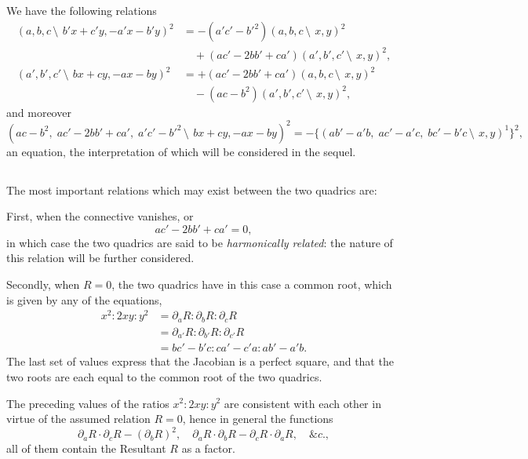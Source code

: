 \documentclass[11pt,a4paper]{book}
\begin{document}
\begin{center}
\subsection{}

We have the following relations
\begin{align*}
(a, b, c\,\setminus\!\!\:\, b'x + c'y, -a'x - b'y)^2 &= -(a'c' - b'^2)(a, b, c\,\setminus\!\!\:\, x, y)^2\\
&\quad + (ac' - 2bb' + ca')(a', b', c'\,\setminus\!\!\:\, x, y)^2,\\
(a', b', c'\,\setminus\!\!\:\, bx + cy, -ax - by)^2 &= +(ac' - 2bb' + ca')(a, b, c\,\setminus\!\!\:\, x, y)^2\\
&\quad - (ac - b^2)(a', b', c'\,\setminus\!\!\:\, x, y)^2,
\end{align*}
and moreover
\[
(ac - b^2,\; ac' - 2bb' + ca',\; a'c' - b'^2\,\setminus\!\!\:\, bx + cy, -ax - by)^2 = -\{(ab' - a'b,\; ac' - a'c,\; bc' - b'c\,\setminus\!\!\:\, x, y)^1\}^2,
\]
an equation, the interpretation of which will be considered in the sequel.

\subsection{}

The most important relations which may exist between the two quadrics are:

First, when the connective vanishes, or
\[
ac' - 2bb' + ca' = 0,
\]
in which case the two quadrics are said to be \textit{harmonically related}: the nature of this relation will be further considered.

Secondly, when $R = 0$, the two quadrics have in this case a common root, which is given by any of the equations,
\begin{align*}
x^2 : 2xy : y^2 &= \partial_a R : \partial_b R : \partial_c R \\
&= \partial_{a'}R : \partial_{b'}R : \partial_{c'}R \\
&= bc' - b'c : ca' - c'a : ab' - a'b.
\end{align*}
The last set of values express that the Jacobian is a perfect square, and that the two roots are each equal to the common root of the two quadrics.

The preceding values of the ratios $x^2 : 2xy : y^2$ are consistent with each other in virtue of the assumed relation $R = 0$, hence in general the functions
\[
\partial_a R \cdot \partial_c R - (\partial_b R)^2, \quad \partial_a R \cdot \partial_b R - \partial_c R \cdot \partial_a R, \quad \&c.,
\]
all of them contain the Resultant $R$ as a factor.


\end{center}
\end{document}
